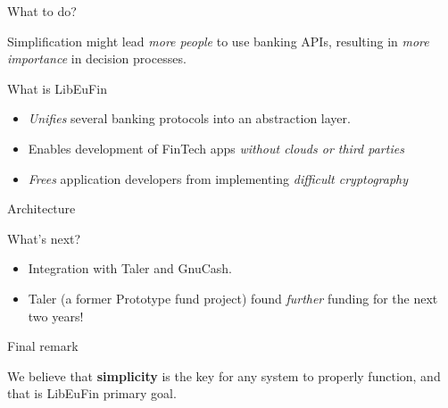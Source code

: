 \documentclass[pdf]{beamer}
\begin{document}
\begin{frame}{What to do?}
  \begin{center}
  Simplification might lead {\it more people} to use banking APIs,
  resulting in {\it more importance} in decision processes.
  \end{center}
\end{frame}

\begin{frame}{What is LibEuFin}
  \begin{itemize}
  \item {\it Unifies} several banking protocols into an abstraction layer.
  \item Enables development of FinTech apps {\it without clouds or third parties}
  \item {\it Frees} application developers from implementing {\it difficult cryptography}
  \end{itemize}
\end{frame}

\begin{frame}{Architecture}
\end{frame}

\begin{frame}{What's next?}
  \begin{itemize}
    \item Integration with Taler and GnuCash.
    \item Taler (a former Prototype fund project) found {\it further} funding for the next two years!
  \end{itemize}
\end{frame}

\begin{frame}{Final remark}
  \begin{center}
  We believe that \textbf{simplicity} is the key for any system to
  properly function, and that is LibEuFin primary goal.
  \end{center}
\end{frame}
\end{document}
